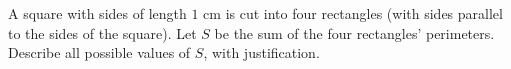 A square with sides of length $1$ cm is cut into four rectangles (with sides parallel to the sides of the square). Let $S$ be the sum of the four rectangles' perimeters. Describe all possible values of $S$, with justification.
